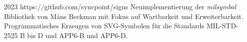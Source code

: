 \cventry
{2023}
{https://github.com/syncpoint/signs}
{}
{}
{}
{
  Neuimplementierung der \emph{milsymbol} Bibliothek von Måns Beckman mit Fokus auf
  Wartbarkeit und Erweiterbarkeit. Programmatisches Erzeugen von SVG-Symbolen für die
  Standards MIL-STD-2525 B bis D und APP6-B und APP6-D.
}
